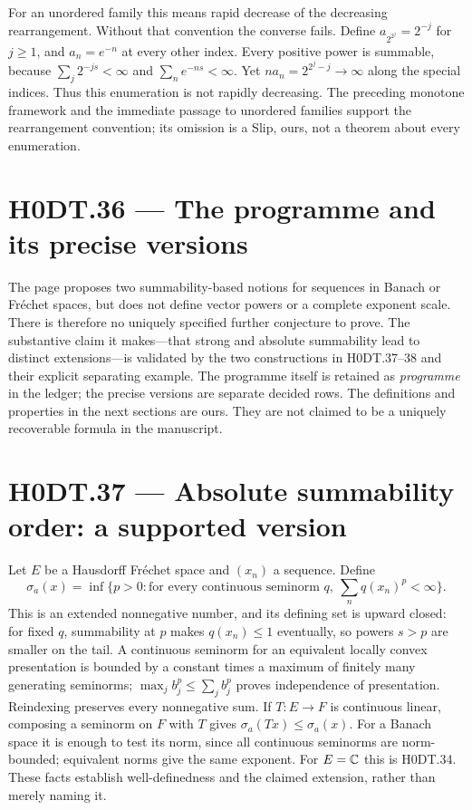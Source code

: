For an unordered family this means rapid decrease of the decreasing rearrangement. Without that convention the converse fails. Define $a_{2^{2^j}}=2^{-j}$ for $j\ge1$, and $a_n=e^{-n}$ at every other index. Every positive power is summable, because $\sum_j2^{-js}<\infty$ and $\sum_ne^{-ns}<\infty$. Yet $n a_n=2^{2^j-j}\to\infty$ along the special indices. Thus this enumeration is not rapidly decreasing. The preceding monotone framework and the immediate passage to unordered families support the rearrangement convention; its omission is a Slip, ours, not a theorem about every enumeration.

\section*{H0DT.36 --- The programme and its precise versions}
The page proposes two summability-based notions for sequences in Banach or Fr\'echet spaces, but does not define vector powers or a complete exponent scale. There is therefore no uniquely specified further conjecture to prove. The substantive claim it makes---that strong and absolute summability lead to distinct extensions---is validated by the two constructions in H0DT.37--38 and their explicit separating example. The programme itself is retained as \emph{programme} in the ledger; the precise versions are separate decided rows. The definitions and properties in the next sections are ours. They are not claimed to be a uniquely recoverable formula in the manuscript.

\section*{H0DT.37 --- Absolute summability order: a supported version}
Let $E$ be a Hausdorff Fr\'echet space and $(x_n)$ a sequence. Define
\[
 \sigma_a(x)=\inf\{p>0:\text{for every continuous seminorm }q,\ \sum_n q(x_n)^p<\infty\}.
\]
This is an extended nonnegative number, and its defining set is upward closed: for fixed $q$, summability at $p$ makes $q(x_n)\le1$ eventually, so powers $s>p$ are smaller on the tail. A continuous seminorm for an equivalent locally convex presentation is bounded by a constant times a maximum of finitely many generating seminorms; $\max_j b_j^p\le\sum_j b_j^p$ proves independence of presentation. Reindexing preserves every nonnegative sum. If $T:E\to F$ is continuous linear, composing a seminorm on $F$ with $T$ gives $\sigma_a(Tx)\le\sigma_a(x)$. For a Banach space it is enough to test its norm, since all continuous seminorms are norm-bounded; equivalent norms give the same exponent. For $E=\mathbb C$ this is H0DT.34. These facts establish well-definedness and the claimed extension, rather than merely naming it.


